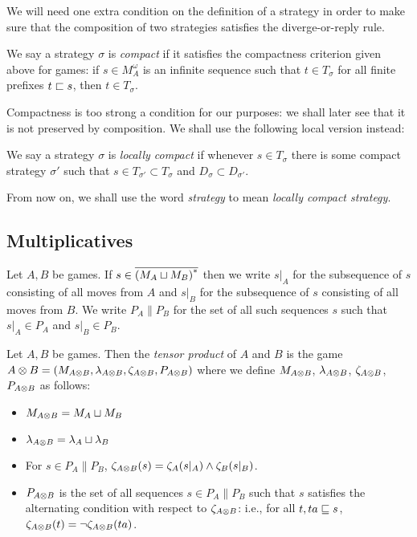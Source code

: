 \documentclass{article}
\begin{document}
We will need one extra condition on the definition of a strategy in order to make sure that the composition of two strategies satisfies the diverge-or-reply rule.

\begin{definition}
  We say a strategy $\sigma$ is \emph{compact} if it satisfies the compactness criterion given above for games: if $s\in M_A^\omega$ is an infinite sequence such that $t\in T_\sigma$ for all finite prefixes $t\sqsubset s$, then $t\in T_\sigma$.  
\end{definition}

Compactness is too strong a condition for our purposes: we shall later see that it is not preserved by composition.  We shall use the following local version instead:

\begin{definition}
  We say a strategy $\sigma$ is \emph{locally compact} if whenever $s\in T_\sigma$ there is some compact strategy $\sigma'$ such that $s\in T_{\sigma'}\subset T_\sigma$ and $D_\sigma\subset D_{\sigma'}$.
\end{definition}

From now on, we shall use the word \emph{strategy} to mean \emph{locally compact strategy}.

\subsection{Multiplicatives}

Let $A,B$ be games.  If $s\in {\overline{{(M_A\sqcup M_B)}^{*}}}$ then we write $s\vert_A$ for the subsequence of $s$ consisting of all moves from $A$ and $s\vert_B$ for the subsequence of $s$ consisting of all moves from $B$.  We write $P_A\|P_B$ for the set of all such sequences $s$ such that $s\vert_A\in P_A$ and $s\vert_B\in P_B$.  

\begin{definition}
  Let $A,B$ be games.  Then the \emph{tensor product} of $A$ and $B$ is the game $A\otimes B=(M_{A\otimes B}, \lambda_{A\otimes B}, \zeta_{A\otimes B}, P_{A\otimes B})$ where we define $M_{A\otimes B}$, $\lambda_{A\otimes B}$, $\zeta_{A\otimes B}$, $P_{A\otimes B}$ as follows:
  \begin{itemize}
    \item $M_{A\otimes B} = M_A \sqcup M_B$
    \item $\lambda_{A\otimes B} = \lambda_A \sqcup \lambda_B$
    \item For $s\in P_A\|P_B$, $\zeta_{A\otimes B}(s) = \zeta_A(s\vert_A) \wedge \zeta_B(s\vert_B)$.
    \item $P_{A\otimes B}$ is the set of all sequences $s\in P_A\|P_B$ such that $s$ satisfies the alternating condition with respect to $\zeta_{A\otimes B}$: i.e., for all $t,ta\sqsubseteq s$, $\zeta_{A\otimes B}(t) = \neg\zeta_{A\otimes B}(ta)$.  
  \end{itemize}
\end{definition}
\end{document}
